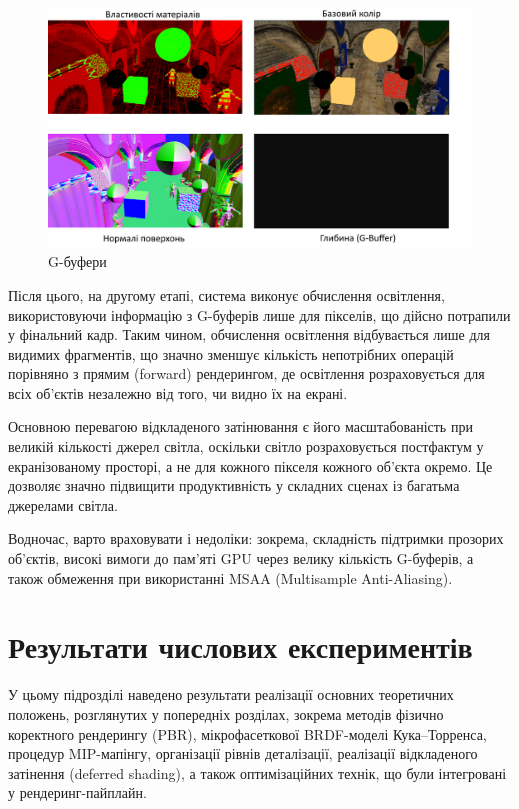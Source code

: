 \begin{figure}[h]
  \centering
  \includegraphics[scale=0.75]{Pictures/G-buffer.png}
  \caption{G-буфери}
  \label{fig:G}
\end{figure}


\par Після цього, на другому етапі, система виконує обчислення освітлення, використовуючи інформацію з G-буферів лише для пікселів, що дійсно потрапили у фінальний кадр. Таким чином, обчислення освітлення відбувається лише для видимих фрагментів, що значно зменшує кількість непотрібних операцій порівняно з прямим (forward) рендерингом, де освітлення розраховується для всіх об'єктів незалежно від того, чи видно їх на екрані.

\par Основною перевагою відкладеного затінювання є його масштабованість при великій кількості джерел світла, оскільки світло розраховується по\-ст\-фак\-тум у екранізованому просторі, а не для кожного пікселя кожного об’єкта окремо. Це дозволяє значно підвищити продуктивність у складних сценах із ба\-гать\-ма джерелами світла.

\par Водночас, варто враховувати і недоліки: зокрема, складність підтримки прозорих об’єктів, високі вимоги до пам’яті GPU через велику кількість G-буферів, а також обмеження при використанні MSAA (Multisample Anti-Alia\-sing).

\section{Результати числових експериментів}

\par У цьому підрозділі наведено результати реалізації основних теоретичних положень, розглянутих у попередніх розділах, зокрема методів фізично коректного рендерингу (PBR), мік\-ро\-фа\-сет\-ко\-вої BRDF-моделі Кука–Торренса, процедур MIP-мапінгу, організації рівнів деталізації, реалізації відкладеного затінення (deferred shading), а також оптимізаційних технік, що були інтегровані у рендеринг-пайплайн.

